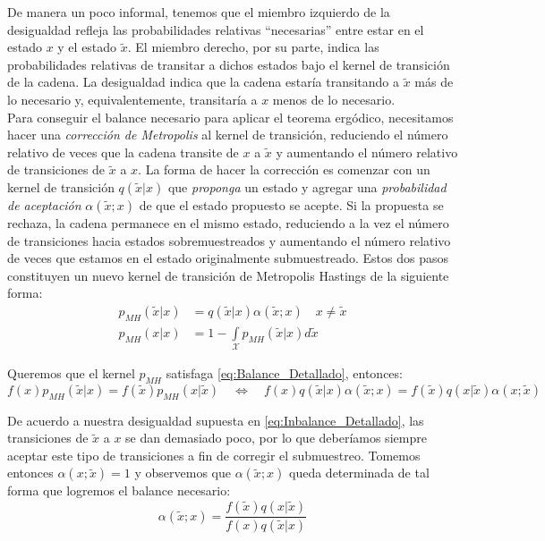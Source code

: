 De manera un poco informal, tenemos que el miembro izquierdo de la desigualdad refleja las probabilidades relativas ``necesarias'' entre estar en el estado $x$ y el estado $\tilde{x}$. El miembro derecho, por su parte, indica las probabilidades relativas de transitar a dichos estados bajo el kernel de transición de la cadena. La desigualdad indica que la cadena estaría transitando a $\tilde{x}$ más de lo necesario y, equivalentemente, transitaría a $x$ menos de lo necesario.\\ 

Para conseguir el balance necesario para aplicar el teorema ergódico, necesitamos hacer una \textit{corrección de Metropolis} al kernel de transición, reduciendo el número relativo de veces que la cadena transite de $x$ a $\tilde{x}$ y aumentando el número relativo de transiciones de $\tilde{x}$ a $x$. La forma de hacer la corrección es comenzar con un kernel de transición $q(\tilde{x}|x)$ que \textit{proponga} un estado y agregar una \textit{probabilidad de aceptación} $\alpha(\tilde{x};x)$ de que el estado propuesto se acepte. Si la propuesta se rechaza, la cadena permanece en el mismo estado, reduciendo a la vez el número de transiciones hacia estados sobremuestreados y aumentando el número relativo de veces que estamos en el estado originalmente submuestreado. Estos dos pasos constituyen un nuevo kernel de transición de Metropolis Hastings de la siguiente forma: 
\begin{align*}
p_{MH}(\tilde{x}|x) &= q(\tilde{x}|x)\alpha(\tilde{x};x) \quad x \neq \tilde{x} \\
p_{MH}(x|x) &= 1 - \int\limits_\mathcal{X} p_{MH}(\tilde{x}|x)d\tilde{x}
\end{align*}

Queremos que el kernel $p_{MH}$ satisfaga \eqref{eq:Balance_Detallado}, entonces:
\begin{equation*}
f(x)p_{MH}(\tilde{x}|x)=f(\tilde{x})p_{MH}(x|\tilde{x}) \quad \Leftrightarrow \quad f(x)q(\tilde{x}|x)\alpha(\tilde{x};x)=f(\tilde{x})q(x|\tilde{x})\alpha(x;\tilde{x}) 
\end{equation*}

De acuerdo a nuestra desigualdad supuesta en \eqref{eq:Inbalance_Detallado}, las transiciones de $\tilde{x}$ a $x$ se dan demasiado poco, por lo que deberíamos siempre aceptar este tipo de transiciones a fin de corregir el submuestreo. Tomemos entonces $\alpha(x;\tilde{x}) = 1$ y observemos que $\alpha(\tilde{x};x)$ queda determinada de tal forma que logremos el balance necesario: 
\begin{equation*}
\alpha(\tilde{x};x)=\dfrac{f(\tilde{x})q(x|\tilde{x})}{f(x)q(\tilde{x}|x)}
\end{equation*}


